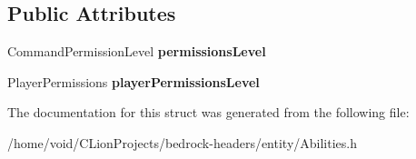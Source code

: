 \subsection*{Public Attributes}
\begin{DoxyCompactItemize}
\item 
\mbox{\label{struct_permissions_handler_acc7e4748ce2b277c98a26eefc54caf48}} 
Command\+Permission\+Level {\bfseries permissions\+Level}
\item 
\mbox{\label{struct_permissions_handler_a107f24bee3e6355eb864051aaad97b5a}} 
Player\+Permissions {\bfseries player\+Permissions\+Level}
\end{DoxyCompactItemize}


The documentation for this struct was generated from the following file\+:\begin{DoxyCompactItemize}
\item 
/home/void/\+C\+Lion\+Projects/bedrock-\/headers/entity/Abilities.\+h\end{DoxyCompactItemize}
